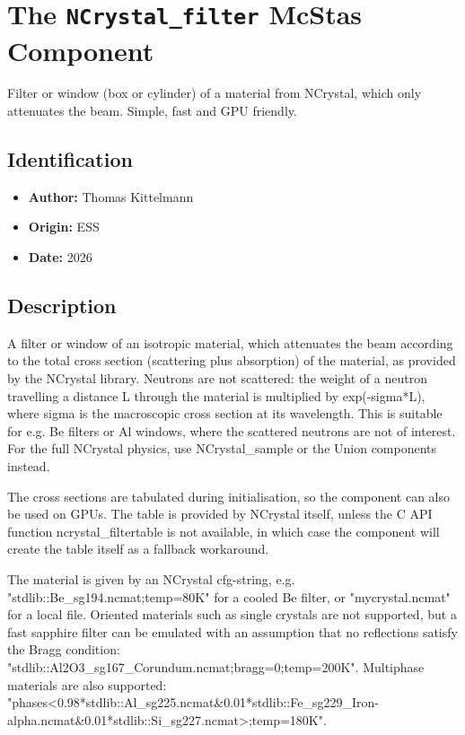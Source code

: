 \section{The \texttt{NCrystal\_filter} McStas Component}
Filter or window (box or cylinder) of a material from NCrystal, which only
attenuates the beam. Simple, fast and GPU friendly.

\subsection*{Identification}
\begin{itemize}
  \item \textbf{Author:} Thomas Kittelmann
  \item \textbf{Origin:} ESS
  \item \textbf{Date:} 2026
\end{itemize}

\subsection*{Description}
A filter or window of an isotropic material, which attenuates the beam according to the total cross section (scattering plus absorption) of the material, as provided by the NCrystal library. Neutrons are not scattered: the weight of a neutron travelling a distance L through the material is multiplied by exp(-sigma*L), where sigma is the macroscopic cross section at its wavelength. This is suitable for e.g. Be filters or Al windows, where the scattered neutrons are not of interest. For the full NCrystal physics, use NCrystal\_sample or the Union components instead.

The cross sections are tabulated during initialisation, so the component can also be used on GPUs. The table is provided by NCrystal itself, unless the C API function ncrystal\_filtertable is not available, in which case the component will create the table itself as a fallback workaround.

The material is given by an NCrystal cfg-string, e.g. "stdlib::Be\_sg194.ncmat;temp=80K" for a cooled Be filter, or "mycrystal.ncmat" for a local file. Oriented materials such as single crystals are not supported, but a fast sapphire filter can be emulated with an assumption that no reflections satisfy the Bragg condition: "stdlib::Al2O3\_sg167\_Corundum.ncmat;bragg=0;temp=200K". Multiphase materials are also supported: "phases\textless{}0.98*stdlib::Al\_sg225.ncmat\&0.01*stdlib::Fe\_sg229\_Iron-alpha.ncmat\&0.01*stdlib::Si\_sg227.ncmat\textgreater{};temp=180K".

